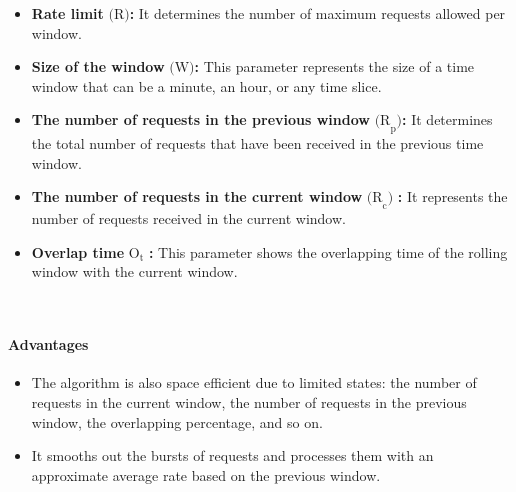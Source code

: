 \begin{itemize}
\item
\protect{}\label{K82RBE9s6c1TLINLCID3J}
\textbf{Rate limit} \protect{}\label{katex_inline_cr4jvMm8YCXKkylFND-Un}{{{\(\text{(R)}\)}}}\textbf{:} It determines the number of maximum requests allowed per window.
\item
\protect{}\label{QoM0wfX784qiHATMPukXX}
\textbf{Size of the window} \protect{}\label{katex_inline_TLIo6A7kNknttigHq3M58}{{{\(\text{(W)}\)}}}\textbf{:} This parameter represents the size of a time window that can be a minute, an hour, or any time slice.
\item
\protect{}\label{LhvkIaXHuJrx39CiG7L8E}
\textbf{The number of requests in the previous window} \protect{}\label{katex_inline_bwMjARGu4Q3-ddsDj6Qab}{{{\(\text{(R}_\text{{p}})\)}}}\textbf{:} It determines the total number of requests that have been received in the previous time window.
\item
\protect{}\label{4Zhq-1ni58RULfAk1dCqC}
\textbf{The number of requests in the current window} \protect{}\label{katex_inline_0D4FjGEUW9uF_Yj8JA5L-}{{{\(\text{(R}_\text{{c}})\)}}} \textbf{:} It represents the number of requests received in the current window.
\item
\protect{}\label{F5Voxv7FjBvpZmC7Vm4Ig}
\textbf{Overlap time} \protect{}\label{katex_inline_vrZWPbFADHcfGPj9l_vZj}{{{\(\text{O}_\text{{t}}\)}}} \textbf{:} This parameter shows the overlapping time of the rolling window with the current window.
\end{itemize}
\\
\paragraph{Advantages}\label{0zdVcY3Tv5Lw4ira5kc0T}

\begin{itemize}
\item
\protect{}\label{nYRD04w51FYGPBy4pu8XE}
The algorithm is also space efficient due to limited states: the number of requests in the current window, the number of requests in the previous window, the overlapping percentage, and so on.
\item
\protect{}\label{r9nwPJcgCC1p5NOISu-bn}
It smooths out the bursts of requests and processes them with an approximate average rate based on the previous window.
\end{itemize}
\\
